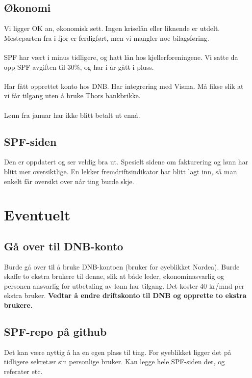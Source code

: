 \documentclass[a4paper,norsk]{article}
\begin{document}
\subsection*{Økonomi}
Vi ligger OK an, økonomisk sett. Ingen kriselån eller liknende er utdelt. Mesteparten fra i fjor er ferdigført, men vi mangler noe bilagsføring. \\
\\
SPF har vært i minus tidligere, og hatt lån hos kjellerforeningene. Vi satte da opp SPF-avgiften til 30\%, og har i år gått i pluss. \\
\\
Har fått opprettet konto hos DNB. Har integrering med Visma. Må fikse slik at vi får tilgang uten å bruke Thors bankbrikke. \\
\\
Lønn fra januar har ikke blitt betalt ut ennå.

\subsection*{SPF-siden}
Den er oppdatert og ser veldig bra ut. Spesielt sidene om fakturering og lønn har blitt mer oversiktlige. En lekker fremdriftsindikator har blitt lagt inn, så man enkelt får oversikt over når ting burde skje.

\section{Eventuelt}
\subsection*{Gå over til DNB-konto}
Burde gå over til å bruke DNB-kontoen (bruker for øyeblikket Nordea). Burde skaffe to ekstra brukere til denne, slik at både leder, økonominasvarlig og personen ansvarlig for utbetaling av lønn har tilgang. Det koster 40 kr/mnd per ekstra bruker. 
\textbf{Vedtar å endre driftskonto til DNB og opprette to ekstra brukere.}

\subsection*{SPF-repo på github}
Det kan være nyttig å ha en egen plass til ting. For øyeblikket ligger det på tidligere sekretær sin personlige bruker. Kan legge hele SPF-siden der, og referater etc. 
\end{document}

